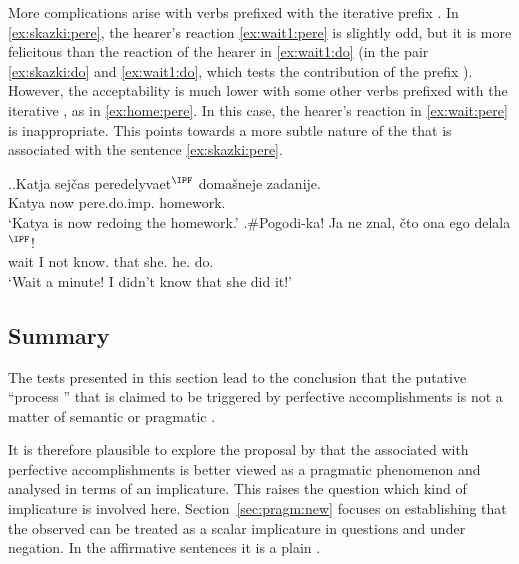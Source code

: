 More complications arise with verbs prefixed with the iterative prefix . In \ref{ex:skazki:pere}, the hearer's reaction \ref{ex:wait1:pere} is slightly odd, but it is more felicitous than the reaction of the hearer in \ref{ex:wait1:do} (in the pair \ref{ex:skazki:do} and \ref{ex:wait1:do}, which tests the contribution of the prefix ). However, the acceptability is much lower with some other verbs prefixed with the iterative , as in \ref{ex:home:pere}. In this case, the hearer's reaction in \ref{ex:wait:pere} is inappropriate. This points towards a more subtle nature of the  that is associated with the sentence \ref{ex:skazki:pere}.

\ex.\ag.\label{ex:home:pere}Katja sej\v{c}as peredelyvaet$^{\IPF}$ {doma\v{s}neje zadanije}.\\
Katya now pere.do.imp. homework.\\
\trans `Katya is now redoing the homework.'
\bg.\#Pogodi-ka! Ja ne znal, \v{c}to ona ego delala$^{\IPF}$!\label{ex:wait:pere}\\
wait I not know. that she. he. do.\\
\trans `Wait a minute! I didn't know that she did it!'

\subsection{Summary}
The tests presented in this section lead to the conclusion that the putative ``process '' that is claimed to be triggered by perfective accomplishments is not a matter of semantic or pragmatic .

It is therefore plausible to explore the proposal by \citet{Gronn:04, Gronn:06} that the  associated with perfective accomplishments is better viewed as a pragmatic phenomenon and analysed in terms of an implicature.
This raises the question which kind of implicature is involved here. Section~\ref{sec:pragm:new} focuses on establishing that the observed  can be treated as a scalar implicature in questions and under negation. In the affirmative sentences it is a plain .

